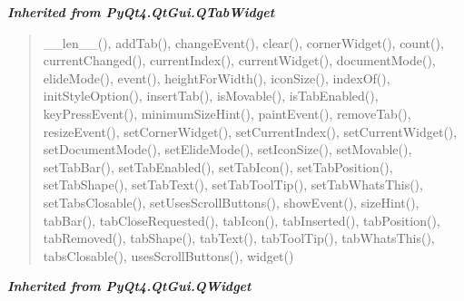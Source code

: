 \large{\textbf{\textit{Inherited from PyQt4.QtGui.QTabWidget}}}

\begin{quote}
\_\_len\_\_(), addTab(), changeEvent(), clear(), cornerWidget(), count(), currentChanged(), currentIndex(), currentWidget(), documentMode(), elideMode(), event(), heightForWidth(), iconSize(), indexOf(), initStyleOption(), insertTab(), isMovable(), isTabEnabled(), keyPressEvent(), minimumSizeHint(), paintEvent(), removeTab(), resizeEvent(), setCornerWidget(), setCurrentIndex(), setCurrentWidget(), setDocumentMode(), setElideMode(), setIconSize(), setMovable(), setTabBar(), setTabEnabled(), setTabIcon(), setTabPosition(), setTabShape(), setTabText(), setTabToolTip(), setTabWhatsThis(), setTabsClosable(), setUsesScrollButtons(), showEvent(), sizeHint(), tabBar(), tabCloseRequested(), tabIcon(), tabInserted(), tabPosition(), tabRemoved(), tabShape(), tabText(), tabToolTip(), tabWhatsThis(), tabsClosable(), usesScrollButtons(), widget()
\end{quote}

\large{\textbf{\textit{Inherited from PyQt4.QtGui.QWidget}}}

